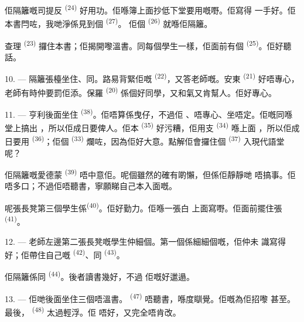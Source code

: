佢隔籬嘅司提反 \textsuperscript{(24)} 好用功。佢喺簿上面抄低下堂要用嘅嘢。佢寫得
一手好。佢本書閂咗，我哋淨係見到個 \textsuperscript{(27)}。
佢個 \textsuperscript{(26)} 就喺佢隔籬。

查理 \textsuperscript{(23)} 攞住本書；佢揭開嚟溫書。同每個學生一樣，佢面前有個
 \textsuperscript{(25)}。佢好聽話。

10. --- 隔籬張檯坐住、同。路易背緊佢嘅
 \textsuperscript{(22)}，又答老師嘅。安東
\textsuperscript{(21)} 好唔專心，老師有時仲要罰佢添。保羅 \textsuperscript{(20)}
係個好同學，又和氣又肯幫人。佢好專心。

\VUsaut{4.2mm}
\VUsaut{3.2mm}

11. --- 亨利後面坐住 \textsuperscript{(38)}。佢唔算係曳仔，不過佢
、唔專心、坐唔定。佢嘅同喺堂上搞出
，所以佢成日要俾人。佢本
\textsuperscript{(35)} 好污糟，佢用支 \textsuperscript{(34)} 喺上面
，所以佢成日要用 \textsuperscript{(36)}；佢個
 \textsuperscript{(33)} 爛咗，因為佢好大意。點解佢會攞住個
 \textsuperscript{(37)} 入現代語堂呢？

佢隔籬嘅愛德蒙 \textsuperscript{(39)} 唔中意佢。呢個雖然的確有啲懶，但係佢靜靜哋
唔搞事。佢唔多口；不過佢唔聽書，寧願睇自己本入面嘅。

呢張長凳第三個學生係\textsuperscript{(40)}。佢好勤力。佢喺一張白
上面寫嘢。佢面前擺住張 \textsuperscript{(41)}。

12. --- 老師左邊第二張長凳嘅學生仲細個。第一個係細細個嘅，佢仲未
識寫得好；佢帶住自己嘅 \textsuperscript{(42)}、同
 \textsuperscript{(43)}。

佢隔籬係同 \textsuperscript{(44)}。後者讀書幾好，不過
佢嘅好邋遢。

13. --- 佢哋後面坐住三個唔溫書。
\textsuperscript{(47)} 唔聽書，喺度瞓覺。佢嘅為佢招嚟
甚至。最後， \textsuperscript{(48)} 太過輕浮。佢
唔好，又完全唔肯改。

